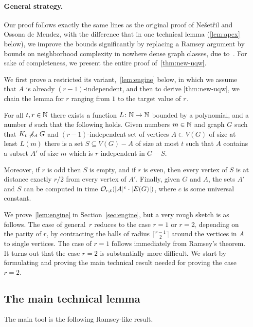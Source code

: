 \paragraph{General strategy.}
Our proof follows exactly the same lines as the original proof of Ne\v set\v ril and Ossona de Mendez, with the difference that in one technical lemma (\cref{lem:apex} below), we improve the bounds significantly by replacing a Ramsey argument by bounds on neighborhood
complexity in nowhere dense graph classes, due to~\cite{gajarsky2017kernelization}.
For sake of completeness, we present the entire proof of~\cref{thm:new-uqw}.


We first prove a restricted its variant,~\cref{lem:engine} below, in which we assume that $A$ is already $(r-1)$-independent, and then to derive
\cref{thm:new-uqw}, we 
 chain the lemma for $r$ ranging from $1$ to the target value of $r$.

\begin{lemma}\label{lem:engine}
For all $t,r\in \mathbb{N}$ there exists a function $L\colon \mathbb{N}\to \mathbb{N}$ bounded by a polynomial,
and a number $d$ such that the following holds.
Given numbers $m\in \mathbb{N}$ and graph $G$ such that $K_t\not\preccurlyeq_d G$ and
$(r-1)$-independent set of vertices $A\subset V(G)$ of size at least $L(m)$ there is a set $S\subseteq V(G)-A$ of size at most $t$ such that $A$ contains a subset $A'$ of size $m$ which is $r$-independent in $G-S$.

Moreover, if $r$ is odd then $S$ is empty, and if $r$ is even,
then every vertex of $S$ is at distance exactly $ r/2$ from every vertex of $A'$.
Finally, given $G$ and $A$, the sets $A'$ and $S$ can be computed in time $\mathcal{O}_{r,t}(|A|^c\cdot |E(G)|)$, where $c$ is some universal constant.
\end{lemma}

We prove~\cref{lem:engine} in Section~\ref{sec:engine}, but  a very rough sketch is as follows.
The  case of general~$r$ reduces to the case $r=1$ or $r=2$, depending on the parity of $r$,
by contracting the balls of radius $\lceil \frac {r-1} 2\rceil $ around the vertices in $A$ to single vertices.
The case of $r=1$ follows immediately from Ramsey's theorem. 
It turns out that the case $r=2$ is substantially more difficult.
We start by formulating and proving the main technical result needed for proving the case $r=2$.

\subsection{The main technical lemma}
The main tool is the following Ramsey-like result.

